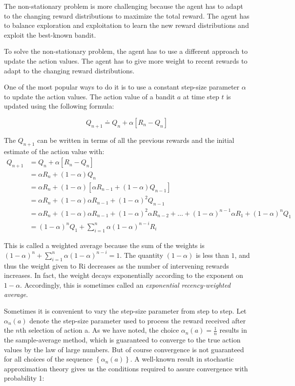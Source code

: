 The non-stationary problem is more challenging because the agent has to adapt to the changing reward distributions to maximize the total reward. The agent has to balance exploration and exploitation to learn the new reward distributions and exploit the best-known bandit.

To solve the non-stationary problem, the agent has to use a different approach to update the action values. The agent has to give more weight to recent rewards to adapt to the changing reward distributions.

One of the most popular ways to do it is to use a constant step-size parameter $\alpha$ to update the action values. The action value of a bandit $a$ at time step $t$ is updated using the following formula:

\begin{equation}
    Q_{n+1} \doteq Q_n + \alpha[R_n - Q_n]
\end{equation}

The $Q_{n+1}$ can be written in terms of all the previous rewards and the initial estimate of the action value with:
\begin{align*}
    Q_{n+1} &= Q_n + \alpha[R_n - Q_n] \\
    &= \alpha R_n + (1-\alpha)Q_n \\
    &= \alpha R_n + (1-\alpha)[\alpha R_{n-1} + (1-\alpha)Q_{n-1}] \\
    &= \alpha R_n + (1-\alpha)\alpha R_{n-1} + (1-\alpha)^2 Q_{n-1} \\
    &= \alpha R_n + (1-\alpha)\alpha R_{n-1} + (1-\alpha)^2\alpha R_{n-2} + \dots + (1-\alpha)^{n-1}\alpha R_1 + (1-\alpha)^nQ_1 \\
    &= (1-\alpha)^nQ_1 + \sum_{i=1}^{n}\alpha(1-\alpha)^{n-i}R_i
\end{align*}

This is called a weighted average because the sum of the weights is $(1-\alpha)^n+\sum_{i=1}^{n}\alpha(1-\alpha)^{n-i}=1$. The quantity $(1-\alpha)$ is less than $1$, and thus the weight given to Ri decreases as the number of intervening rewards increases. In fact, the weight decays exponentially according to the exponent on $1-\alpha$. Accordingly, this is sometimes called an \textit{exponential recency-weighted average}.

Sometimes it is convenient to vary the step-size parameter from step to step. Let $\alpha_n(a)$ denote the step-size parameter used to process the reward received after the $n$th selection of action a. As we have noted, the choice $\alpha_n(a) = \frac{1}{n}$ results in the sample-average method, which is guaranteed to converge to the true action values by the law of large numbers. But of course convergence is not guaranteed for all choices of the sequence $\left\{\alpha_n(a)\right\}$. A well-known result in stochastic approximation theory gives us the conditions required to assure convergence with probability 1:

